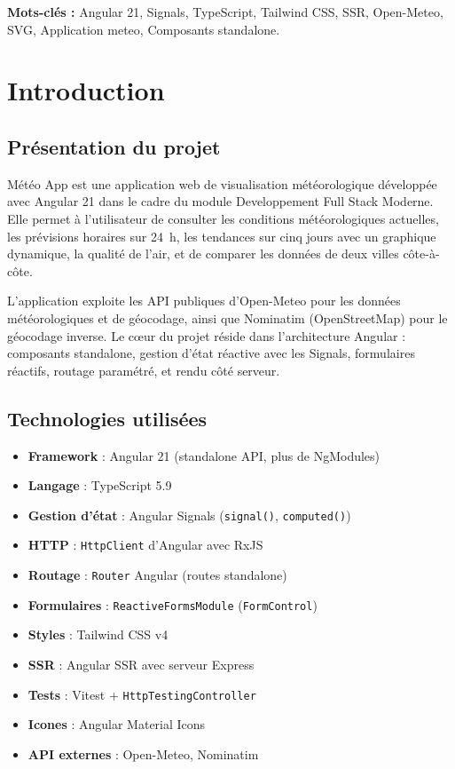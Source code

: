 \documentclass[12pt,a4paper]{article}
\begin{document}
\vfill

\begin{center}
\textbf{Mots-clés :} Angular 21, Signals, TypeScript, Tailwind CSS, SSR, Open-Meteo, SVG, Application meteo, Composants standalone.
\end{center}

\newpage

\tableofcontents
\newpage

\section{Introduction}
\label{sec:intro}

\subsection{Présentation du projet}

Météo App est une application web de visualisation météorologique développée avec Angular 21 dans le cadre du module \og{}Developpement Full Stack Moderne\fg{}. Elle permet à l'utilisateur de consulter les conditions météorologiques actuelles, les prévisions horaires sur 24~h, les tendances sur cinq jours avec un graphique dynamique, la qualité de l'air, et de comparer les données de deux villes côte-à-côte.

L'application exploite les API publiques d'Open-Meteo pour les données météorologiques et de géocodage, ainsi que Nominatim (OpenStreetMap) pour le géocodage inverse. Le c\oe ur du projet réside dans l'architecture Angular : composants standalone, gestion d'état réactive avec les Signals, formulaires réactifs, routage paramétré, et rendu côté serveur.

\subsection{Technologies utilisées}

\begin{itemize}[nosep]
    \item \textbf{Framework} : Angular 21 (standalone API, plus de NgModules)
    \item \textbf{Langage} : TypeScript 5.9
    \item \textbf{Gestion d'état} : Angular Signals (\texttt{signal()}, \texttt{computed()})
    \item \textbf{HTTP} : \texttt{HttpClient} d'Angular avec RxJS
    \item \textbf{Routage} : \texttt{Router} Angular (routes standalone)
    \item \textbf{Formulaires} : \texttt{ReactiveFormsModule} (\texttt{FormControl})
    \item \textbf{Styles} : Tailwind CSS v4
    \item \textbf{SSR} : Angular SSR avec serveur Express
    \item \textbf{Tests} : Vitest + \texttt{HttpTestingController}
    \item \textbf{Icones} : Angular Material Icons
    \item \textbf{API externes} : Open-Meteo, Nominatim
\end{itemize}
\end{document}
